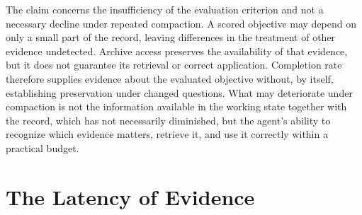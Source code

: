 \documentclass[11pt]{article}
\begin{document}
The claim concerns the insufficiency of the evaluation criterion and not a necessary decline under repeated compaction. A scored objective may depend on only a small part of the record, leaving differences in the treatment of other evidence undetected. Archive access preserves the availability of that evidence, but it does not guarantee its retrieval or correct application. Completion rate therefore supplies evidence about the evaluated objective without, by itself, establishing preservation under changed questions. What may deteriorate under compaction is not the information available in the working state together with the record, which has not necessarily diminished, but the agent's ability to recognize which evidence matters, retrieve it, and use it correctly within a practical budget.

\section{The Latency of Evidence}
\end{document}

